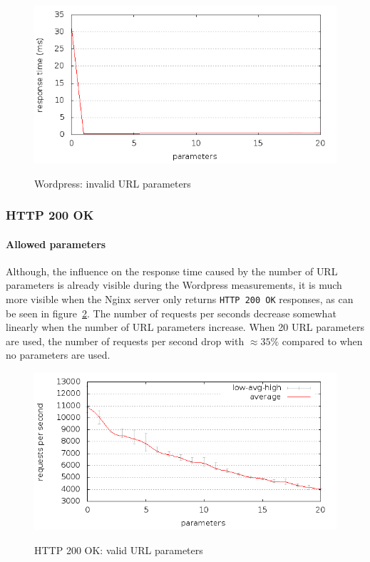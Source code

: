 \documentclass[Experiments]{subfiles}
\begin{document}
\begin{figure}[H]
\caption{Wordpress: invalid URL parameters}
\centering
\includegraphics[scale=0.55] {images/results/wp_with_naxsi_incremented_disallowed_parameters/output.png}
\label{fig:Invalid parameters}
\end{figure}

\subsubsection{HTTP 200 OK}

\paragraph{Allowed parameters}
Although, the influence on the response time caused by the number of \ac{URL} parameters is already visible during the Wordpress measurements, it is much more visible when the Nginx server only returns  \verb+HTTP 200 OK+ responses, as can be seen in figure~\ref{fig:HTTP 200 OK: valid url parameters}. The number of requests per seconds decrease somewhat linearly when the number of \ac{URL} parameters increase. When 20 \ac{URL} parameters are used, the number of requests per second drop with $\approx 35\%$ compared to when no parameters are used.

\begin{figure}[H]
\caption{HTTP 200 OK: valid URL parameters}
\centering
\includegraphics[scale=0.55] {images/results/200_with_naxsi_incremented_allowed_parameters/output.png}
\label{fig:HTTP 200 OK: valid url parameters}
\end{figure}
\end{document}

